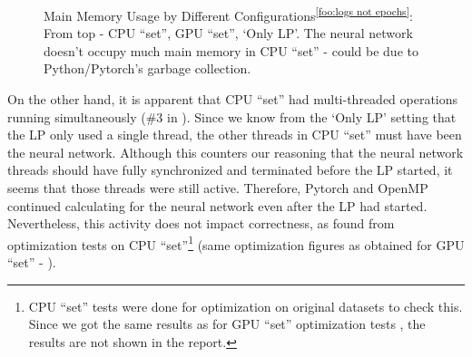 \begin{appendices}
\begin{figure}[!htbp]
\begin{minipage}{.49\textwidth}
            \caption[Main Memory Usage by Different Configurations]{Main Memory Usage by Different Configurations\textsuperscript{\ref{foo:logs not epochs}}: From top - CPU ``set'', GPU ``set'', `Only LP'. The neural network doesn't occupy much main memory in CPU ``set'' - could be due to Python/Pytorch's garbage collection.}
            \label{fig:Main Memory Usage by Different Configurations}
        \end{minipage}
    \end{figure}

    On the other hand, it is apparent that CPU ``set'' had multi-threaded operations running simultaneously (\#3 in ). Since we know from the `Only LP' setting that the LP only used a single thread, the other threads in CPU ``set'' must have been the neural network. Although this counters our reasoning that the neural network threads should have fully synchronized and terminated before the LP started, it seems that those threads were still active. Therefore, Pytorch and OpenMP continued calculating for the neural network even after the LP had started. Nevertheless, this activity does not impact correctness, as found from optimization tests on CPU ``set''\footnote{CPU ``set'' tests were done for optimization on original datasets to check this. Since we got the same results as for GPU ``set'' optimization tests , the results are not shown in the report.} (same optimization figures as obtained for GPU ``set'' - ).
    

\end{appendices}
